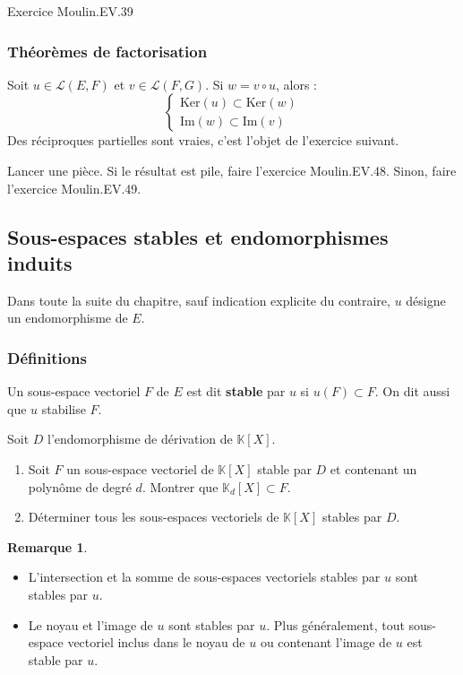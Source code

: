 \documentclass[french]{article}
\newcommand{\K}{\mathbb{K}}
\renewcommand{\ker}{\text{Ker}}
\theoremstyle{plain}
\theoremstyle{definition}
\newtheorem*{rmq}{Remarque}
\theoremstyle{remark}
\begin{document}
Exercice Moulin.EV.39

\subsubsection*{Théorèmes de factorisation}
Soit $u\in\mathcal{L}(E,F)$ et $v\in\mathcal{L}(F,G)$. Si $w=v\circ u$, alors : $$\begin{cases}
	\ker(u)\subset\ker(w)\\
	\text{Im}(w)\subset\text{Im}(v)
\end{cases}$$ Des réciproques partielles sont vraies, c'est l'objet de l'exercice suivant.

\begin{exo}
	Lancer une pièce. Si le résultat est pile, faire l'exercice Moulin.EV.48. Sinon, faire l'exercice Moulin.EV.49.
\end{exo}

\subsection{Sous-espaces stables et endomorphismes induits}

Dans toute la suite du chapitre, sauf indication explicite du contraire, $u$ désigne un endomorphisme de $E$.

\subsubsection*{Définitions}

\begin{dfn}
	Un sous-espace vectoriel $F$ de $E$ est dit \textbf{stable} par $u$ si $u(F)\subset F$. On dit aussi que $u$ stabilise $F$.
\end{dfn}

\begin{exo}
	Soit $D$ l'endomorphisme de dérivation de $\K[X]$.
	\begin{enumerate}
		\item Soit $F$ un sous-espace vectoriel de $\K[X]$ stable par $D$ et contenant un polynôme de degré $d$. Montrer que $\K_d[X]\subset F$.
		\item Déterminer tous les sous-espaces vectoriels de $\K[X]$ stables par $D$.
	\end{enumerate}
\end{exo}

\begin{rmq}
	\begin{itemize}
		\item L'intersection et la somme de sous-espaces vectoriels stables par $u$ sont stables par $u$.
		\item Le noyau et l'image de $u$ sont stables par $u$. Plus généralement, tout sous-espace vectoriel inclus dans le noyau de $u$ ou contenant l'image de $u$ est stable par $u$.
	\end{itemize}
\end{rmq}
\end{document}
